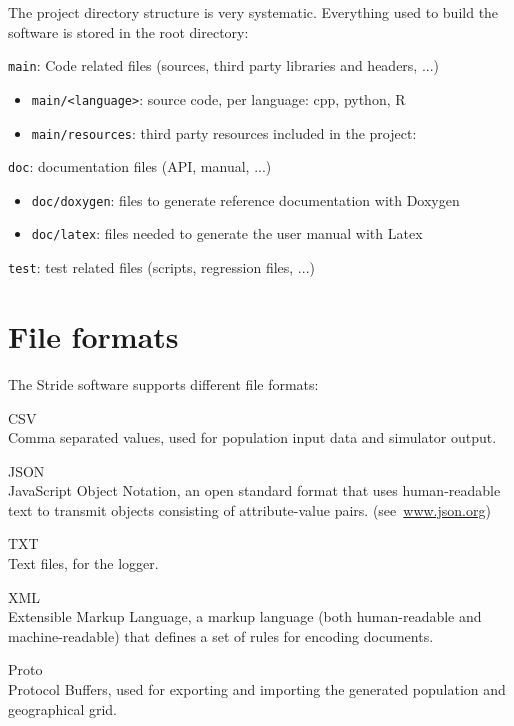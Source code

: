 The project directory structure is very systematic.
Everything used to build the software is stored in the root directory:
\begin{compactitem}
    \item \texttt{main}: Code related files (sources, third party libraries and headers, ...)
      	\begin{itemize}
        		\item \texttt{main/<language>}: source code, per language: cpp, python, R
        		\item \texttt{main/resources}: third party resources included in the project:
        \end{itemize}
    \item \texttt{doc}: documentation files (API, manual, ...)
      	\begin{itemize}
        		\item \texttt{doc/doxygen}: files to generate reference documentation with Doxygen
        		\item \texttt{doc/latex}: files needed to generate the user manual with Latex
        \end{itemize}
    \item \texttt{test}: test related files (scripts, regression files, ...)
\end{compactitem}

\section{File formats}
\label{section:FileFormats}

The Stride software supports different file formats:
\begin{compactdesc}
	\item [CSV] \ \\
	Comma separated values, used for population input data and simulator output.
	\item [JSON] \ \\
	JavaScript Object Notation, an open standard format that uses human-readable text to transmit objects consisting of attribute-value pairs. 	 \mbox{(see \url{www.json.org})}
	\item [TXT] \ \\
	Text files, for the logger.
	\item [XML] \ \\
	Extensible Markup Language, a markup language (both human-readable and machine-readable) that defines a set of rules for encoding documents.
    \item [Proto] \ \\
    Protocol Buffers, used for exporting and importing the generated population and geographical grid.
\end{compactdesc}


